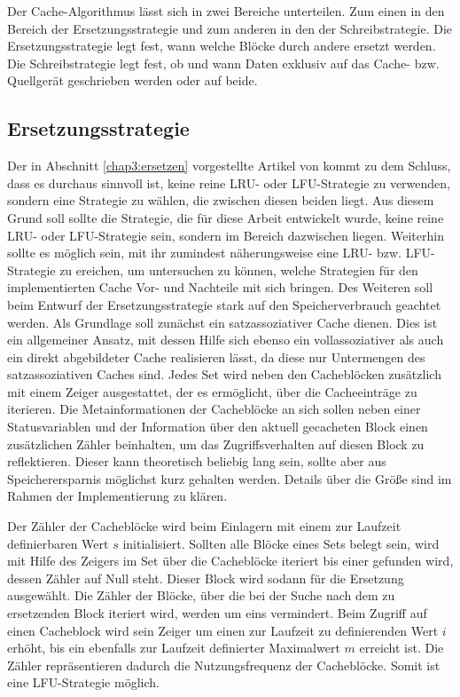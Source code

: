 Der Cache-Algorithmus lässt sich in zwei Bereiche unterteilen. Zum einen in den Bereich der Ersetzungsstrategie und zum anderen in den der Schreibstrategie. Die
Ersetzungsstrategie legt fest, wann welche Blöcke durch andere ersetzt werden. Die Schreibstrategie legt fest, ob und wann Daten exklusiv auf das Cache- bzw.
Quellgerät geschrieben werden oder auf beide.

\subsection{Ersetzungsstrategie}
\label{chap5:algo1}

Der in Abschnitt \ref{chap3:ersetzen} vorgestellte Artikel von \textcite{cache1} kommt zu dem Schluss, dass es durchaus sinnvoll ist, keine reine \ac{LRU}- oder
\ac{LFU}-Strategie zu verwenden, sondern eine Strategie zu wählen, die zwischen diesen beiden liegt. Aus diesem Grund soll sollte die Strategie, die für diese
Arbeit entwickelt wurde, keine reine \ac{LRU}- oder \ac{LFU}-Strategie sein, sondern im Bereich dazwischen liegen.
Weiterhin sollte es möglich sein, mit ihr zumindest näherungsweise eine \ac{LRU}- bzw. \ac{LFU}-Strategie zu ereichen, um untersuchen zu können, welche Strategien für den implementierten Cache Vor- und Nachteile
mit sich bringen. Des Weiteren soll beim Entwurf der Ersetzungsstrategie stark auf den Speicherverbrauch geachtet werden. Als Grundlage soll zunächst ein
satzassoziativer Cache dienen. Dies ist ein allgemeiner Ansatz, mit dessen Hilfe sich ebenso ein vollassoziativer als auch ein direkt abgebildeter Cache
realisieren lässt, da diese nur Untermengen des satzassoziativen Caches sind. Jedes Set wird neben den Cacheblöcken zusätzlich mit einem Zeiger ausgestattet, der es
ermöglicht, über die Cacheeinträge zu iterieren. Die Metainformationen der Cacheblöcke an sich sollen neben einer Statusvariablen und der Information über den
aktuell gecacheten Block einen zusätzlichen Zähler beinhalten, um das Zugriffsverhalten auf diesen Block zu reflektieren. Dieser kann theoretisch beliebig lang
sein, sollte aber aus Speicherersparnis möglichst kurz gehalten werden. Details über die Größe sind im Rahmen der Implementierung zu klären.

Der Zähler der Cacheblöcke wird beim Einlagern mit einem zur Laufzeit definierbaren Wert $s$ initialisiert. Sollten alle Blöcke eines Sets belegt sein, wird
mit Hilfe des Zeigers im Set über die Cacheblöcke iteriert bis einer gefunden wird, dessen Zähler auf Null steht. Dieser Block wird sodann für die Ersetzung
ausgewählt. Die Zähler der Blöcke, über die bei der Suche nach dem zu ersetzenden Block iteriert wird, werden um eins vermindert. Beim Zugriff auf einen
Cacheblock wird sein Zeiger um einen zur Laufzeit zu definierenden Wert $i$ erhöht, bis ein ebenfalls zur Laufzeit definierter Maximalwert $m$ erreicht ist. Die
Zähler repräsentieren dadurch die Nutzungsfrequenz der Cacheblöcke. Somit ist eine \ac{LFU}-Strategie möglich.

